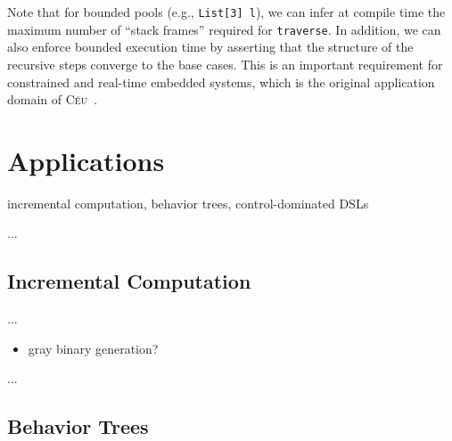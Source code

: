 \documentclass{acm_proc_article-sp}
\newcommand{\CEU}{\textsc{C\'{e}u}\xspace}
\newcommand{\code}[1] {{\small{\texttt{#1}}}}
\begin{document}
Note that for bounded pools (e.g., \code{List[3] l}), we can infer at compile 
time the maximum number of ``stack frames'' required for \code{traverse}.
In addition, we can also enforce bounded execution time by asserting that the 
structure of the recursive steps converge to the base cases.
This is an important requirement for constrained and real-time embedded 
systems, which is the original application domain of \CEU~\cite{ceu.sensys13}.

\begin{comment}
\begin{figure}%
\begin{lstlisting}[numbers=left,xleftmargin=3em]
class FoldL with
   pool List[]&   l;
   pool Action[]& actions;
   var  int&     acc;
do
   traverse e in l do
      if e:CONS then
         var Action*? a =
            spawn Action in actions with
               this.e    = e;
               action.acc = acc;
            end
         await *a;
      end
   end
end
\end{lstlisting}
\caption{
Calculating the \emph{sum} of a list.
\label{lst.sum}
}
\end{figure}
\end{comment}

\section{Applications}

incremental computation, behavior trees, control-dominated DSLs

...

\subsection{Incremental Computation}

...

\begin{itemize}
\item gray binary generation?
\end{itemize}

...

\subsection{Behavior Trees}
\end{document}
